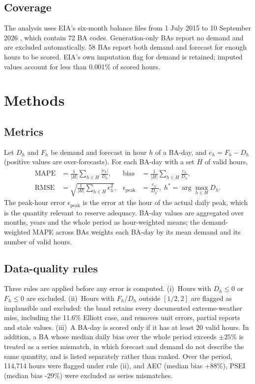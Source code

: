 \documentclass[conference]{IEEEtran}
\begin{document}
\subsection{Coverage}
The analysis uses EIA's six-month balance files from 1 July 2015 to 10 September 2026 \cite{eia930monitor}, which contain 72 BA codes. Generation-only BAs report no demand and are excluded automatically. 58 BAs report both demand and forecast for enough hours to be scored. EIA's own imputation flag for demand is retained; imputed values account for less than 0.001\% of scored hours.

\section{Methods}
\subsection{Metrics}
Let $D_h$ and $F_h$ be demand and forecast in hour $h$ of a BA-day, and $e_h = F_h - D_h$ (positive values are over-forecasts). For each BA-day with a set $H$ of valid hours,
\begin{align}
\mathrm{MAPE} &= \frac{1}{|H|}\sum_{h\in H} \frac{|e_h|}{D_h}, &
\mathrm{bias} &= \frac{1}{|H|}\sum_{h\in H} \frac{e_h}{D_h}, \\
\mathrm{RMSE} &= \sqrt{\frac{1}{|H|}\sum_{h\in H} e_h^2}, &
\epsilon_{\mathrm{peak}} &= \frac{e_{h^\ast}}{D_{h^\ast}},\; h^\ast = \arg\max_{h\in H} D_h .
\end{align}
The peak-hour error $\epsilon_{\mathrm{peak}}$ is the error at the hour of the actual daily peak, which is the quantity relevant to reserve adequacy. BA-day values are aggregated over months, years and the whole period as hour-weighted means; the demand-weighted MAPE across BAs weights each BA-day by its mean demand and its number of valid hours.

\subsection{Data-quality rules}
Three rules are applied before any error is computed. (i)~Hours with $D_h \le 0$ or $F_h \le 0$ are excluded. (ii)~Hours with $F_h/D_h$ outside $[1/2, 2]$ are flagged as implausible and excluded: the band retains every documented extreme-weather miss, including the 11.6\% Elliott case, and removes unit errors, partial reports and stale values. (iii)~A BA-day is scored only if it has at least 20 valid hours. In addition, a BA whose median daily bias over the whole period exceeds $\pm 25\%$ is treated as a series mismatch, in which forecast and demand do not describe the same quantity, and is listed separately rather than ranked. Over the period, 114,714 hours were flagged under rule (ii), and AEC (median bias +88\%), PSEI (median bias -29\%) were excluded as series mismatches.
\end{document}
